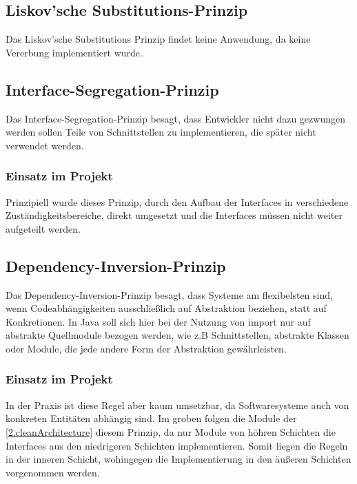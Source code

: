 		\subsection{Liskov’sche Substitutions-Prinzip}
		Das Liskov'sche Substitutions Prinzip findet keine Anwendung, da keine Vererbung implementiert wurde.
		
		\subsection{Interface-Segregation-Prinzip}
		Das Interface-Segregation-Prinzip besagt, dass Entwickler nicht dazu gezwungen werden sollen Teile von Schnittstellen zu implementieren, die später nicht verwendet werden. 
			\subsubsection{Einsatz im Projekt}
			Prinzipiell wurde dieses Prinzip, durch den Aufbau der Interfaces in verschiedene Zuständigkeitsbereiche, direkt umgesetzt und die Interfaces müssen nicht weiter aufgeteilt werden.
		
		\subsection{Dependency-Inversion-Prinzip}
		Das Dependency-Inversion-Prinzip besagt, dass Systeme am flexibelsten sind, wenn Codeabhängigkeiten ausschließlich auf Abstraktion beziehen, statt auf Konkretionen. In Java soll sich hier bei der Nutzung von import nur auf abstrakte Quellmodule bezogen werden, wie z.B Schnittstellen, abstrakte Klassen oder Module, die jede andere Form der Abstraktion gewährleisten.
			\subsubsection{Einsatz im Projekt}
			In der Praxis ist diese Regel aber kaum umsetzbar, da Softwaresysteme auch von konkreten Entitäten abhängig sind. Im groben folgen die Module der \cref{2.cleanArchitecture} diesem Prinzip, da nur Module von höhren Schichten die Interfaces aus den niedrigeren Schichten implementieren. Somit liegen die Regeln in der inneren Schicht, wohingegen die Implementierung in den äußeren Schichten vorgenommen werden.

